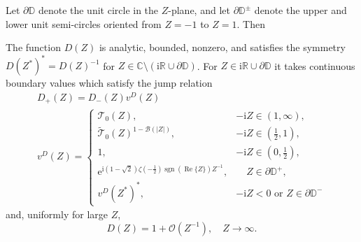 \documentclass[12pt]{amsart}
\numberwithin{equation}{section}
\newcommand{\ee}{\mathrm{e}}
\newcommand{\ii}{\mathrm{i}}
\newcommand{\C}{\mathbb{C}}
\newcommand{\R}{\mathbb{R}}
\newcommand{\bigo}[1]{ \mathcal{O}\! \left( #1 \right) }
\DeclareMathOperator{\sgn}{sgn}
\renewcommand{\Re}{\operatorname{Re}}
\begin{document}
Let $\partial \mathbb{D}$ denote the unit circle in the $Z$-plane, and let $\partial \mathbb{D}^\pm$ denote the upper and lower unit semi-circles oriented from $Z=-1$ to $Z=1$. Then
\begin{prop}
The function $D(Z)$ is analytic, bounded, nonzero, and satisfies the symmetry $D(Z^*)^* =  D(Z)^{-1}$ for $Z \in \C \setminus (\ii \R \cup \partial \mathbb{D})$. 
For $Z \in \ii \R \cup \partial \mathbb{D}$ it takes continuous boundary values which satisfy the jump relation
\begin{gather}
	D_+(Z) = D_-(Z) v^D(Z) \\
	v^D(Z) = \begin{cases}
		\mathcal{T}_0(Z), & -\ii Z \in (1,\infty), \\
		\widetilde{\mathcal{T}}_0(Z)^{1-\mathcal{B}(|Z|)},  & -\ii Z \in (\tfrac{1}{2},1), \\
		1,  & -\ii Z \in (0, \tfrac{1}{2}), \\
		\ee^{ \ii (1-\sqrt{2}) \zeta(-\frac{1}{2})  \sgn(\Re\{Z\}) Z^{-1}}, & \phantom{-\ii}Z \in \partial \mathbb{D}^+, \\
		v^D(Z^*)^*, & -\ii Z <0 \text{ or }  Z \in \partial \mathbb{D}^-
	\end{cases}
	\label{eq:D-jump}
\end{gather}
and, uniformly for large $Z$, 
\[
	D(Z) = 1+ \bigo{Z^{-1}},  \quad Z \to \infty. 
\]
\label{prop:D}
\end{prop}
\end{document}
